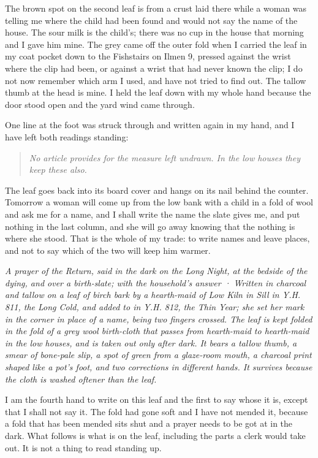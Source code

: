 \documentclass{design/chronicle}
\begin{document}
The brown spot on the second leaf is from a crust laid there while a woman was telling me where the child had been found and would not say the name of the house. The sour milk is the child’s; there was no cup in the house that morning and I gave him mine. The grey came off the outer fold when I carried the leaf in my coat pocket down to the Fishstairs on Ilmen 9, pressed against the wrist where the clip had been, or against a wrist that had never known the clip; I do not now remember which arm I used, and have not tried to find out. The tallow thumb at the head is mine. I held the leaf down with my whole hand because the door stood open and the yard wind came through.

One line at the foot was struck through and written again in my hand, and I have left both readings standing:

\begin{quote}\itshape No article provides for the measure left undrawn. In the low houses they keep these also.\end{quote}

The leaf goes back into its board cover and hangs on its nail behind the counter. Tomorrow a woman will come up from the low bank with a child in a fold of wool and ask me for a name, and I shall write the name the slate gives me, and put nothing in the last column, and she will go away knowing that the nothing is where she stood. That is the whole of my trade: to write names and leave places, and not to say which of the two will keep him warmer.

\clearpage{}
{\centering\FellFont\itshape\footnotesize\color{faded} A prayer of the Return, said in the dark on the Long Night, at the bedside of the dying, and over a birth-slate; with the household’s answer · Written in charcoal and tallow on a leaf of birch bark by a hearth-maid of Low Kiln in Sill in Y.H. 811, the Long Cold, and added to in Y.H. 812, the Thin Year; she set her mark in the corner in place of a name, being two fingers crossed. The leaf is kept folded in the fold of a grey wool birth-cloth that passes from hearth-maid to hearth-maid in the low houses, and is taken out only after dark. It bears a tallow thumb, a smear of bone-pale slip, a spot of green from a glaze-room mouth, a charcoal print shaped like a pot’s foot, and two corrections in different hands. It survives because the cloth is washed oftener than the leaf.\par}\medskip
I am the fourth hand to write on this leaf and the first to say whose it is, except that I shall not say it. The fold had gone soft and I have not mended it, because a fold that has been mended sits shut and a prayer needs to be got at in the dark. What follows is what is on the leaf, including the parts a clerk would take out. It is not a thing to read standing up.
\end{document}
